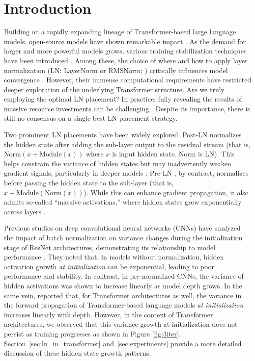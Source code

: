 \section{Introduction}
\label{sec:intro}

Building on a rapidly expanding lineage of Transformer-based large language models, open-source models have shown remarkable impact \citep{chinchilla, llama3, guo2025deepseek}. As the demand for larger and more powerful models grows, various training stabilization techniques have been introduced \citep{tensorprogram5, attentioncollapse, ngpt}. Among these, the choice of where and how to apply layer normalization (LN: LayerNorm or RMSNorm; \citealp{LN, RMSNorm}) critically influences model convergence \citep{onlayer, transformersgetstable, smallproxies, embeddingln}. However, their immense computational requirements have restricted deeper exploration of the underlying Transformer structure. Are we truly employing the optimal LN placement? In practice, fully revealing the results of massive resource investments can be challenging \citep{gemma2}. Despite its importance, there is still no consensus on a single best LN placement strategy. 

Two prominent LN placements have been widely explored. Post-LN \citep{attentionisallyouneed} normalizes the hidden state after adding the sub-layer output to the residual stream (that is, $\mathrm{Norm}(x + \mathrm{Module}(x))$ where $x$ is input hidden state. $\mathrm{Norm}$ is LN). This helps constrain the variance of hidden states but may inadvertently weaken gradient signals, particularly in deeper models \citep{transformersgetstable}. Pre-LN \citep{llama3}, by contrast, normalizes before passing the hidden state to the sub-layer (that is, $x + \mathrm{Module}(\mathrm{Norm}(x))$). While this can enhance gradient propagation, it also admits so-called “massive activations,” where hidden states grow exponentially across layers \citep{massiveactivation, smallproxies, attentioncollapse}.

Previous studies on deep convolutional neural networks (CNNs) have analyzed the impact of batch normalization on variance changes during the initialization stage of ResNet architectures, demonstrating its relationship to model performance \citep{cnnvariance}. They noted that, in models without normalization, hidden activation growth \emph{at initialization} can be exponential, leading to poor performance and stability. In contrast, in pre-normalized CNNs, the variance of hidden activations was shown to increase linearly as model depth grows. 
In the same vein, \citet{transformersgetstable} reported that, for Transformer architectures as well, the variance in the forward propagation of Transformer-based language models \emph{at initialization} increases linearly with depth.
However, in the context of Transformer architectures, we observed that this variance growth at initialization does not persist as training progresses as shown in Figure \ref{fig:3iter}.
Section~\ref{sec:ln_in_transformer} and~\ref{sec:experiments} provide a more detailed discussion of these hidden-state growth patterns.


